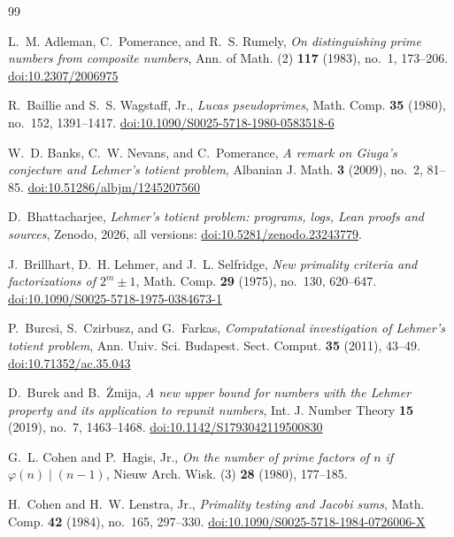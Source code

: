 \documentclass[11pt,reqno]{amsart}
\numberwithin{equation}{section}
\theoremstyle{plain}
\theoremstyle{definition}
\theoremstyle{remark}
\begin{document}
\begin{thebibliography}{99}
\raggedright

L.~M. Adleman, C.~Pomerance, and R.~S. Rumely,
\emph{On distinguishing prime numbers from composite numbers},
Ann. of Math. (2) \textbf{117} (1983), no.~1, 173--206.
\href{https://doi.org/10.2307/2006975}{doi:10.2307/2006975}

R.~Baillie and S.~S. Wagstaff, Jr.,
\emph{Lucas pseudoprimes},
Math. Comp. \textbf{35} (1980), no.~152, 1391--1417.
\href{https://doi.org/10.1090/S0025-5718-1980-0583518-6}{doi:10.1090/S0025-5718-1980-0583518-6}

W.~D. Banks, C.~W. Nevans, and C.~Pomerance,
\emph{A remark on Giuga's conjecture and Lehmer's totient problem},
Albanian J. Math. \textbf{3} (2009), no.~2, 81--85.
\href{https://doi.org/10.51286/albjm/1245207560}{doi:10.51286/albjm/1245207560}

D.~Bhattacharjee,
\emph{Lehmer's totient problem: programs, logs, Lean proofs and
sources}, Zenodo, 2026, all versions:
\href{https://doi.org/10.5281/zenodo.23243779}{doi:10.5281/zenodo.23243779}.

J.~Brillhart, D.~H. Lehmer, and J.~L. Selfridge,
\emph{New primality criteria and factorizations of $2^m\pm1$},
Math. Comp. \textbf{29} (1975), no.~130, 620--647.
\href{https://doi.org/10.1090/S0025-5718-1975-0384673-1}{doi:10.1090/S0025-5718-1975-0384673-1}

P.~Burcsi, S.~Czirbusz, and G.~Farkas,
\emph{Computational investigation of Lehmer's totient problem},
Ann. Univ. Sci. Budapest. Sect. Comput. \textbf{35} (2011), 43--49.
\href{https://doi.org/10.71352/ac.35.043}{doi:10.71352/ac.35.043}

D.~Burek and B.~\.Zmija,
\emph{A new upper bound for numbers with the Lehmer property and its
application to repunit numbers},
Int. J. Number Theory \textbf{15} (2019), no.~7, 1463--1468.
\href{https://doi.org/10.1142/S1793042119500830}{doi:10.1142/S1793042119500830}

G.~L. Cohen and P.~Hagis, Jr.,
\emph{On the number of prime factors of $n$ if $\varphi(n)\mid(n-1)$},
Nieuw Arch. Wisk. (3) \textbf{28} (1980), 177--185.

H.~Cohen and H.~W. Lenstra, Jr.,
\emph{Primality testing and Jacobi sums},
Math. Comp. \textbf{42} (1984), no.~165, 297--330.
\href{https://doi.org/10.1090/S0025-5718-1984-0726006-X}{doi:10.1090/S0025-5718-1984-0726006-X}


\end{thebibliography}
\end{document}
